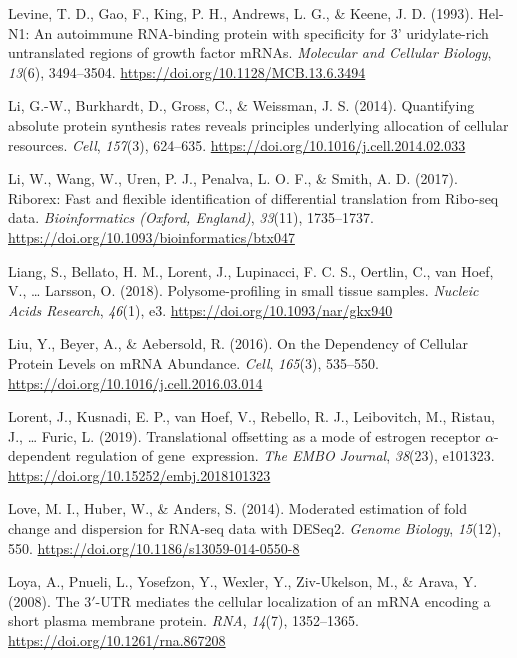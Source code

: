 \documentclass[12pt,openany]{book}
\begin{document}
\hypertarget{ref-Levine1993}{}
Levine, T. D., Gao, F., King, P. H., Andrews, L. G., \& Keene, J. D.
(1993). Hel-N1: An autoimmune RNA-binding protein with specificity for
3' uridylate-rich untranslated regions of growth factor mRNAs.
\emph{Molecular and Cellular Biology}, \emph{13}(6), 3494--3504.
\url{https://doi.org/10.1128/MCB.13.6.3494}

\hypertarget{ref-Li2014}{}
Li, G.-W., Burkhardt, D., Gross, C., \& Weissman, J. S. (2014).
Quantifying absolute protein synthesis rates reveals principles
underlying allocation of cellular resources. \emph{Cell}, \emph{157}(3),
624--635. \url{https://doi.org/10.1016/j.cell.2014.02.033}

\hypertarget{ref-Li2017}{}
Li, W., Wang, W., Uren, P. J., Penalva, L. O. F., \& Smith, A. D.
(2017). Riborex: Fast and flexible identification of differential
translation from Ribo-seq data. \emph{Bioinformatics (Oxford, England)},
\emph{33}(11), 1735--1737.
\url{https://doi.org/10.1093/bioinformatics/btx047}

\hypertarget{ref-Liang2018}{}
Liang, S., Bellato, H. M., Lorent, J., Lupinacci, F. C. S., Oertlin, C.,
van Hoef, V., \ldots{} Larsson, O. (2018). Polysome-profiling in small
tissue samples. \emph{Nucleic Acids Research}, \emph{46}(1), e3.
\url{https://doi.org/10.1093/nar/gkx940}

\hypertarget{ref-Liu2016}{}
Liu, Y., Beyer, A., \& Aebersold, R. (2016). On the Dependency of
Cellular Protein Levels on mRNA Abundance. \emph{Cell}, \emph{165}(3),
535--550. \url{https://doi.org/10.1016/j.cell.2016.03.014}

\hypertarget{ref-Lorent2019}{}
Lorent, J., Kusnadi, E. P., van Hoef, V., Rebello, R. J., Leibovitch,
M., Ristau, J., \ldots{} Furic, L. (2019). Translational offsetting as a
mode of estrogen receptor \(\alpha\)-dependent regulation of
gene~expression. \emph{The EMBO Journal}, \emph{38}(23), e101323.
\url{https://doi.org/10.15252/embj.2018101323}

\hypertarget{ref-Love2014}{}
Love, M. I., Huber, W., \& Anders, S. (2014). Moderated estimation of
fold change and dispersion for RNA-seq data with DESeq2. \emph{Genome
Biology}, \emph{15}(12), 550.
\url{https://doi.org/10.1186/s13059-014-0550-8}

\hypertarget{ref-Loya2008}{}
Loya, A., Pnueli, L., Yosefzon, Y., Wexler, Y., Ziv-Ukelson, M., \&
Arava, Y. (2008). The 3\({'}\)-UTR mediates the cellular localization of
an mRNA encoding a short plasma membrane protein. \emph{RNA},
\emph{14}(7), 1352--1365. \url{https://doi.org/10.1261/rna.867208}
\end{document}
